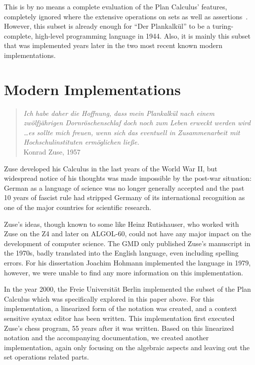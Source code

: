 \documentclass{llncs}
\begin{document}
 This is by no means a complete evaluation of the Plan Calculus' features, completely ignored where 
 the extensive operations on sets as well as assertions~\cite{zuse1948allgemeinen,epegmagHorstzuse}. 
 However, this subset is already enough for ``Der Plankalkül'' to be a turing-complete, high-level 
 programming language in 1944. Also, it is mainly this subset that was implemented years later in 
 the two most recent known modern implementations.
 \section{Modern Implementations}
 \begin{quote}
   \raggedright
   {\it Ich habe daher die Hoffnung, dass mein Plankalkül nach einem zwölfjährigen Dornröschenschlaf 
     doch noch zum Leben erweckt werden wird \dots es sollte mich freuen, wenn sich das eventuell in 
     Zusammenarbeit mit Hochschulinstituten ermöglichen ließe.}\\
   \raggedleft Konrad Zuse, 1957
 \end{quote}
 Zuse developed his Calculus in the last years of the World War II, but widespread notice of his
 thoughts was made impossible by the post-war situation: German as a language of science was no 
 longer generally accepted and the past 10 years of fascist rule had stripped Germany of its international 
 recognition as one of the major countries for scientific research.

 Zuse's ideas, though known to some like Heinz Rutishauser, who worked with Zuse on the Z4\cite{epegmagHorstzuse} and 
 later on ALGOL-60,
 could not have any major impact on the development of computer science. The GMD only published Zuse's
 manuscript in the 1970s, badly translated into the English language, even including spelling errors\cite{giloi2002konrad}.
 For his dissertation Joachim Hohmann implemented the language in 1979\cite{rojas2002konrad}, however, we were 
 unable to find any more information on this implementation.

 In the year 2000, the Freie Universität Berlin implemented the subset of the Plan Calculus which was specifically 
 explored in this paper above\cite{rojas2002plankalkuel}. For this implementation, a linearized form of the notation was created, and 
 a context sensitive syntax editor has been written. This implementation first executed Zuse's chess program, 
 55 years after it was written. Based on this linearized notation and the accompanying documentation, 
 we created another implementation, again only focusing on the algebraic aspects and leaving out the 
 set operations related parts. 
 
\end{document}
